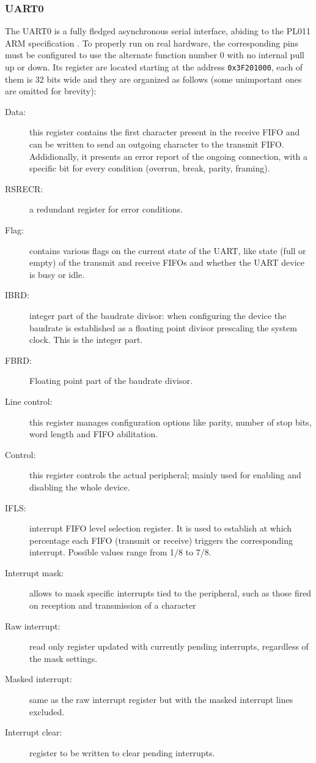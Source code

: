 \documentclass[12pt,a4paper,openright,twoside]{report}
\begin{document}
\subsubsection{UART0}
The UART0 is a fully fledged asynchronous serial interface, abiding to the 
PL011 ARM specification \cite{pl011}. To properly run on real hardware, the
corresponding pins must be configured to use the alternate function number 0 with
no internal pull up or down.
Its register are located starting at the address {\tt 0x3F201000}, each of them
is 32 bits wide and they are organized as follows (some unimportant ones are omitted for brevity):
\begin{description}
    \item[Data:] this register contains the first character present in 
            the receive FIFO and can be written to send an outgoing character to 
            the transmit FIFO. Addidionally, it presents an error report of the ongoing
            connection, with a specific bit for every condition (overrun, break,
            parity, framing).
    \item[RSRECR:] a redundant register for error conditions.
    \item[Flag:] contains various flags on the current state of the UART, like 
            state (full or empty) of the transmit and receive FIFOs and whether
            the UART device is busy or idle.
    \item[IBRD:] integer part of the baudrate divisor: when configuring the device
            the baudrate is established as a floating point divisor prescaling
            the system clock. This is the integer part.
    \item[FBRD:] Floating point part of the baudrate divisor.
    \item[Line control:] this register manages configuration options like
            parity, number of stop bits, word length and FIFO abilitation.
    \item[Control:] this register controls the actual peripheral; mainly used
            for enabling and disabling the whole device.
    \item[IFLS:] interrupt FIFO level selection register. It is used to establish 
            at which percentage each FIFO (transmit or receive) triggers the
            corresponding interrupt. Possible values range from 1/8 to 7/8.
    \item[Interrupt mask:] allows to mask specific interrupts tied to the peripheral,
            such as those fired on reception and transmission of a character
    \item[Raw interrupt:] read only register updated with currently pending
            interrupts, regardless of the mask settings.
    \item[Masked interrupt:] same as the raw interrupt register but with the
            masked interrupt lines excluded.
    \item[Interrupt clear:] register to be written to clear pending interrupts.
\end{description}
\end{document}

